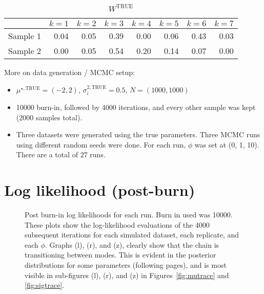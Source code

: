 \documentclass[10pt]{article} %
\def\true{\text{TRUE}}
\begin{document}
\begin{table}[ht]
  \centering
  \begin{tabular}{rrrrrrrr}
    \hline
    & $k=1$ & $k=2$ & $k=3$ & $k=4$ & $k=5$ & $k=6$ & $k=7$ \\
    \hline
    Sample 1 & 0.04 & 0.05 & 0.39 & 0.00 & 0.06 & 0.43 & 0.03 \\
    Sample 2 & 0.00 & 0.05 & 0.54 & 0.20 & 0.14 & 0.07 & 0.00 \\
    \hline
  \end{tabular}
  \caption{$W^\true$}
  \label{tab:W-true}
\end{table}

More on data generation / MCMC setup:
\begin{itemize}
  \item $\mu^{\star,\true}=(-2, 2)$, $\sigma^{2,\true}_i=0.5$, $N=(1000, 1000)$
  \item 10000 burn-in, followed by 4000 iterations, and every other sample was
    kept (2000 samples total).
  \item Three datasets were generated using the true parameters. Three MCMC runs using 
    different random seeds were done. For each run, $\phi$ was set at (0, 1, 10). There
    are a total of 27 runs.
\end{itemize}

\newpage
\section{Log likelihood (post-burn)}
\begin{figure}[H]
  \begin{center}  %
  \end{center}
  \caption{Post burn-in log likelihoods for each run. Burn in used was 10000.
    These plots show the log-likelihood evaluations of the 4000 subsequent
    iterations for each simulated dataset, each replicate, and each $\phi$.
    Graphs (l), (r), and (z), clearly show that the chain is transitioning
    between modes.  This is evident in the posterior distributions for some
    parameters (following pages), and is most visible in sub-figures (l), (r),
    and (z) in Figures~\ref{fig:mutrace} and \ref{fig:sigtrace}.}
  \label{fig:ll}
\end{figure}

\newpage
\end{document}

